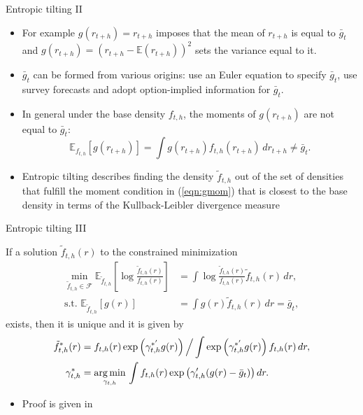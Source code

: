 \documentclass[9pt,xcolor=x11names,compress]{beamer}
\let\oldcite=\cite
\renewcommand{\cite}[1]{\textcolor{dblue}{\oldcite{#1}}}
\theoremstyle{standard}
\theoremstyle{notes}
\newcommand{\argmin}[1]{\underset{#1}{\rm arg \, min } \,}
\begin{document}
\begin{frame}{Entropic tilting II}
	\begin{itemize}
		\item For example $g(r_{t+h})=r_{t+h}$ imposes that the mean of $r_{t+h}$ is equal to $\bar{g}_t$ and $g(r_{t+h})=\left(r_{t+h}-\mathbb{E}\left(r_{t+h}\right)\right)^2$ sets the variance equal to it. 
		\item $\bar{g}_t$ can be formed from various origins: \cite{giacomini2014} use an Euler equation to specify $\bar{g}_t$, \cite{altavilla2014,krueger2015} use survey forecasts and \cite{metaxoglou2016} adopt option-implied information for $\bar{g}_t$.
		\item In general under the base density $f_{t,h}$, the moments of $g(r_{t+h})$ are not equal to $\bar{g}_t$:
		\begin{equation}\label{eqn:expf}
		\mathbb{E}_{f_{t,h}}\left[g(r_{t+h})\right]=\int g(r_{t+h})f_{t,h}(r_{t+h})\,dr_{t+h}\neq\bar{g}_t.
		\end{equation}
		\item Entropic tilting describes finding the density $\tilde{f}_{t,h}$ out of the set of densities that fulfill the moment condition in (\ref{eqn:gmom}) that is closest to the base density in terms of the Kullback-Leibler divergence measure
	\end{itemize}
\end{frame}

\begin{frame}{Entropic tilting III}
\begin{propbox}{}
	If a solution $\tilde{f}_{t,h}(r)$ to the constrained minimization 
	\begin{align}\label{eqn:klic}
	\min_{\tilde{f}_{t,h}\in\mathcal{F}}\mathbb{E}_{\tilde{f}_{t,h}}\left[\log\frac{\tilde{f}_{t,h}(r)}{f_{t,h}(r)}\right]&=\int \log\frac{\tilde{f}_{t,h}(r)}{f_{t,h}(r)} \tilde{f}_{t,h}(r)\,dr,\\
	\text{s.t. }\mathbb{E}_{\tilde{f}_{t,h}}\left[g(r)\right]&=\int g(r)\tilde{f}_{t,h}(r)\,dr=\bar{g}_t,\label{eqn:klic2}
	\end{align}
	exists, then it is unique and it is given by
	\begin{align}\label{eqn:ftilde}
	\tilde{f}_{t,h}^*(r)&=f_{t,h}(r)\exp\left(\gamma_{t,h}^{*'}g(r)\right)\Big/\int\exp\left(\gamma_{t,h}^{*'}g(r)\right)f_{t,h}(r)\,dr,\\
	\gamma_{t,h}^{*}&=\argmin{\gamma_{t,h}}\int f_{t,h}(r)\exp\left(\gamma_{t,h}'(g(r)-\bar{g}_t)\right)dr.\label{eqn:gams}
	\end{align}
\end{propbox} 
\begin{itemize}
\item Proof is given in \cite{giacomini2014}
\end{itemize}
\end{frame}
\end{document}

